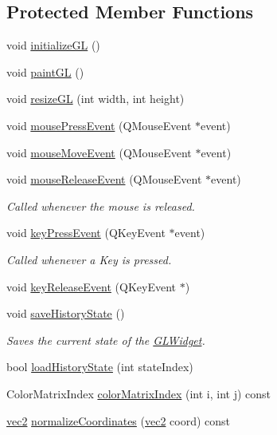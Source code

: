 \subsection*{Protected Member Functions}
\begin{DoxyCompactItemize}
\item 
void \hyperlink{classGLWidget_a7fab13e8cc9fc0730ca54c08b2c923a7}{initialize\-G\-L} ()
\item 
void \hyperlink{classGLWidget_a640b5570cb2b37724fd5b58a77339c5e}{paint\-G\-L} ()
\item 
void \hyperlink{classGLWidget_ac0d2a8ecf60907a81c0d73475d851025}{resize\-G\-L} (int width, int height)
\item 
void \hyperlink{classGLWidget_ab144cc8064c1bbf6d0ef0646ca0bd06c}{mouse\-Press\-Event} (Q\-Mouse\-Event $\ast$event)
\item 
void \hyperlink{classGLWidget_a9043bac13d6f0a5307ea5c7f9b3caa50}{mouse\-Move\-Event} (Q\-Mouse\-Event $\ast$event)
\item 
void \hyperlink{classGLWidget_ab992c4c25439a5ef23031991015451c1}{mouse\-Release\-Event} (Q\-Mouse\-Event $\ast$event)
\begin{DoxyCompactList}\small\item\em Called whenever the mouse is released. \end{DoxyCompactList}\item 
void \hyperlink{classGLWidget_a43dfdc9164dfacb939a173e725651fa9}{key\-Press\-Event} (Q\-Key\-Event $\ast$event)
\begin{DoxyCompactList}\small\item\em Called whenever a Key is pressed. \end{DoxyCompactList}\item 
void \hyperlink{classGLWidget_a3fff7f887bf2ab1df58c870fb6146f31}{key\-Release\-Event} (Q\-Key\-Event $\ast$)
\item 
void \hyperlink{classGLWidget_a9c9e2bd40c564a1e6a4df98960355b6e}{save\-History\-State} ()
\begin{DoxyCompactList}\small\item\em Saves the current state of the \hyperlink{classGLWidget}{G\-L\-Widget}. \end{DoxyCompactList}\item 
bool \hyperlink{classGLWidget_acb2ac0440f3e004a77c31f8b035fb8a4}{load\-History\-State} (int state\-Index)
\item 
Color\-Matrix\-Index \hyperlink{classGLWidget_a6d19cf2624d93499c40163ddb4091783}{color\-Matrix\-Index} (int i, int j) const 
\item 
\hyperlink{classvec2}{vec2} \hyperlink{classGLWidget_ab464e7edbe7729a853d7ccb510d6ef73}{normalize\-Coordinates} (\hyperlink{classvec2}{vec2} coord) const 
\end{DoxyCompactItemize}
